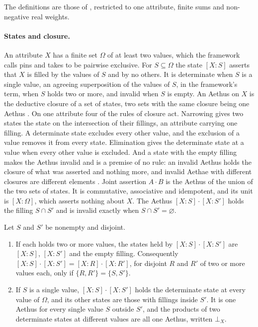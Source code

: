 The definitions are those of \cite{Aethus}, restricted to one attribute, finite sums and non-negative real weights.

\paragraph{States and closure.} An attribute $X$ has a finite set $\Omega$ of at least two values, which the framework calls pins and takes to be pairwise exclusive. For $S \subseteq \Omega$ the state $[X:S]$ asserts that $X$ is filled by the values of $S$ and by no others. It is determinate when $S$ is a single value, an agreeing superposition of the values of $S$, in the framework's term, when $S$ holds two or more, and invalid when $S$ is empty. An Aethus on $X$ is the deductive closure of a set of states, two sets with the same closure being one Aethus \cite{Aethus}. On one attribute four of the rules of closure act. Narrowing gives two states the state on the intersection of their fillings, an attribute carrying one filling. A determinate state excludes every other value, and the exclusion of a value removes it from every state. Elimination gives the determinate state at a value when every other value is excluded. And a state with the empty filling makes the Aethus invalid and is a premise of no rule: an invalid Aethus holds the closure of what was asserted and nothing more, and invalid Aethae with different closures are different elements \cite{Aethus}. Joint assertion $A \cdot B$ is the Aethus of the union of the two sets of states. It is commutative, associative and idempotent, and its unit is $[X:\Omega]$, which asserts nothing about $X$. The Aethus $[X:S] \cdot [X:S']$ holds the filling $S \cap S'$ and is invalid exactly when $S \cap S' = \varnothing$.

\begin{lemma}\label{lem:pair}
Let $S$ and $S'$ be nonempty and disjoint.
\begin{enumerate}
\item[(i)] If each holds two or more values, the states held by $[X:S]\cdot[X:S']$ are $[X:S]$, $[X:S']$ and the empty filling. Consequently $[X:S]\cdot[X:S'] = [X:R]\cdot[X:R']$, for disjoint $R$ and $R'$ of two or more values each, only if $\{R, R'\} = \{S, S'\}$.
\item[(ii)] If $S$ is a single value, $[X:S]\cdot[X:S']$ holds the determinate state at every value of $\Omega$, and its other states are those with fillings inside $S'$. It is one Aethus for every single value $S$ outside $S'$, and the products of two determinate states at different values are all one Aethus, written $\bot_X$.
\end{enumerate}
\end{lemma}

